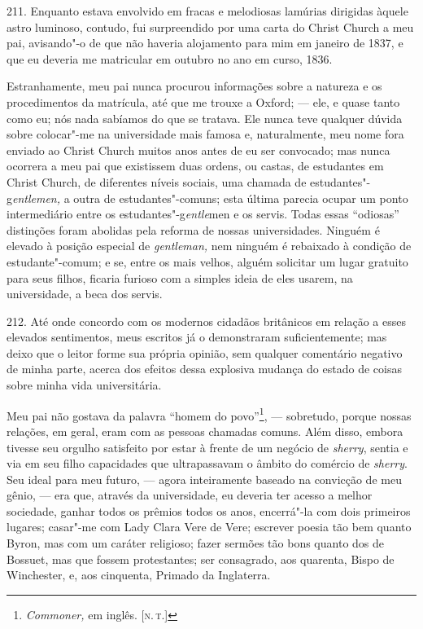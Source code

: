 211. Enquanto estava envolvido em fracas e melodiosas lamúrias dirigidas
àquele astro luminoso, contudo, fui surpreendido por uma carta do Christ
Church a meu pai, avisando"-o de que não haveria alojamento para mim em
janeiro de 1837, e que eu deveria me matricular em outubro no ano em
curso, 1836.

Estranhamente, meu pai nunca procurou informações sobre a natureza e os
procedimentos da matrícula, até que me trouxe a Oxford; --- ele, e quase
tanto como eu; nós nada sabíamos do que se tratava. Ele nunca teve
qualquer dúvida sobre colocar"-me na universidade mais famosa e,
naturalmente, meu nome fora enviado ao Christ Church muitos anos antes
de eu ser convocado; mas nunca ocorrera a meu pai que existissem duas
ordens, ou castas, de estudantes em Christ Church, de diferentes níveis
sociais, uma chamada de estudantes"-g\emph{entlemen,} a outra de
estudantes"-comuns; esta última parecia ocupar um ponto intermediário
entre os estudantes"-g\emph{entle}men e os servis. Todas essas
``odiosas'' distinções foram abolidas pela reforma de nossas
universidades. Ninguém é elevado à posição especial de \emph{gentleman,}
nem ninguém é rebaixado à condição de estudante"-comum; e se, entre os
mais velhos, alguém solicitar um lugar gratuito para seus filhos,
ficaria furioso com a simples ideia de eles usarem, na universidade, a
beca dos servis.

212. Até onde concordo com os modernos cidadãos britânicos em relação a
esses elevados sentimentos, meus escritos já o demonstraram
suficientemente; mas deixo que o leitor forme sua própria opinião, sem
qualquer comentário negativo de minha parte, acerca dos efeitos dessa
explosiva mudança do estado de coisas sobre minha vida universitária.

Meu pai não gostava da palavra ``homem do povo''\footnote{\emph{Commoner,}
  em inglês. {[}\textsc{n.\,t.}{]}}, --- sobretudo, porque nossas relações, em
geral, eram com as pessoas chamadas comuns. Além disso, embora tivesse
seu orgulho satisfeito por estar à frente de um negócio de
\emph{sherry}, sentia e via em seu filho capacidades que ultrapassavam o
âmbito do comércio de \emph{sherry}. Seu ideal para meu futuro, --- agora
inteiramente baseado na convicção de meu gênio, --- era que, através da
universidade, eu deveria ter acesso a melhor sociedade, ganhar todos os
prêmios todos os anos, encerrá"-la com dois primeiros lugares; casar"-me
com Lady Clara Vere de Vere; escrever poesia tão bem quanto Byron, mas
com um caráter religioso; fazer sermões tão bons quanto dos de Bossuet,
mas que fossem protestantes; ser consagrado, aos quarenta, Bispo de
Winchester, e, aos cinquenta, Primado da Inglaterra.

